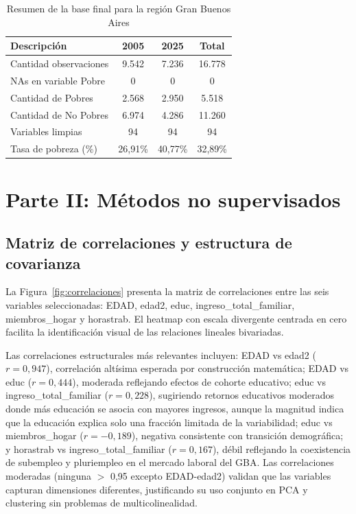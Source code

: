 \documentclass[11pt,a4paper]{article}
\begin{document}
\begin{table}[H]
    \centering
    \begin{tabular}{lccc}
        \toprule
        \textbf{Descripción}   & \textbf{2005} & \textbf{2025} & \textbf{Total} \\
        \midrule
        Cantidad observaciones & 9.542         & 7.236         & 16.778         \\
        NAs en variable Pobre  & 0             & 0             & 0              \\
        Cantidad de Pobres     & 2.568         & 2.950         & 5.518          \\
        Cantidad de No Pobres  & 6.974         & 4.286         & 11.260         \\
        Variables limpias      & 94            & 94            & 94             \\
        \midrule
        Tasa de pobreza (\%)   & 26,91\%       & 40,77\%       & 32,89\%        \\
        \bottomrule
    \end{tabular}
    \caption{Resumen de la base final para la región Gran Buenos Aires}
    \label{tab:resumen}
\end{table}

\section{Parte II: Métodos no supervisados}

\subsection{Matriz de correlaciones y estructura de covarianza}

La Figura~\ref{fig:correlaciones} presenta la matriz de correlaciones entre las seis variables seleccionadas: EDAD, edad2, educ, ingreso\_total\_familiar, miembros\_hogar y horastrab. El heatmap con escala divergente centrada en cero facilita la identificación visual de las relaciones lineales bivariadas.

Las correlaciones estructurales más relevantes incluyen: EDAD vs edad2 ($r = 0,947$), correlación altísima esperada por construcción matemática; EDAD vs educ ($r = 0,444$), moderada reflejando efectos de cohorte educativo; educ vs ingreso\_total\_familiar ($r = 0,228$), sugiriendo retornos educativos moderados donde más educación se asocia con mayores ingresos, aunque la magnitud indica que la educación explica solo una fracción limitada de la variabilidad; educ vs miembros\_hogar ($r = -0,189$), negativa consistente con transición demográfica; y horastrab vs ingreso\_total\_familiar ($r = 0,167$), débil reflejando la coexistencia de subempleo y pluriempleo en el mercado laboral del GBA\@. Las correlaciones moderadas (ninguna $>$ 0,95 excepto EDAD-edad2) validan que las variables capturan dimensiones diferentes, justificando su uso conjunto en PCA y clustering sin problemas de multicolinealidad.
\end{document}
